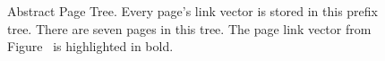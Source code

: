 \begin{figure}[tb]
  \centering
  \resizebox{\textwidth}{!}{}
  \caption[Abstract Page Tree example.]{Abstract Page Tree. Every page's link vector is stored
    in this prefix tree. There are seven pages in this tree. The page link vector
    from Figure~ is highlighted in bold.}
\end{figure}
